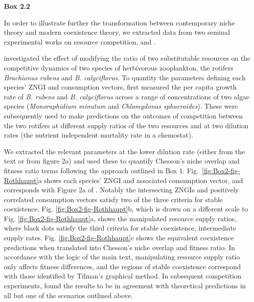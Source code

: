 \clearpage
\begin{flushleft}
	\textbf{Box 2.2}
\end{flushleft}
\begin{infobox}

In order to illustrate further the transformation between contemporary niche theory and modern coexistence theory, we extracted data from two seminal experimental works on resource competition, \citet{Rothhaupt1988} and \citet{Tilman1977}. 
\par


\citet{Rothhaupt1988} investigated the effect of modifying the ratio of two substitutable resources on the competitive dynamics of two species of herbivorous zooplankton, the rotifers \textit{Brachionus rubens} and \textit{B. calyciflorus}. To quantity the parameters defining each species' ZNGI and consumption vectors, \citet{Rothhaupt1988} first measured the per capita growth rate of \textit{B. rubens} and \textit{B. calyciflorus} across a range of concentrations of two algae species (\textit{Monoraphidium minutum} and \textit{Chlamydonas sphaeroides}). These were subsequently used to make predictions on the outcomes of competition between the two rotifers at different supply ratios of the two resources and at two dilution rates (the nutrient independent mortality rate in a chemostat).
\par


We extracted the relevant parameters at the lower dilution rate (either from the text or from figure 2a) and used these to quantify Chesson's niche overlap and fitness ratio terms following the approach outlined in Box 1. Fig.~\ref{fig:Box2-fig-Rothhaupt}a shows each species' ZNGI and associated consumption vector, and corresponds with Figure 2a of \citet{Rothhaupt1988}. Notably the intersecting ZNGIs and positively correlated consumption vectors satisfy two of the three criteria for stable coexistence. Fig. \ref{fig:Box2-fig-Rothhaupt}b, which is drawn on a different scale to Fig. \ref{fig:Box2-fig-Rothhaupt}a, shows the manipulated resource supply ratios, where black dots satisfy the third criteria for stable coexistence, intermediate supply rates. Fig. \ref{fig:Box2-fig-Rothhaupt}c shows the equivalent coexistence predictions when translated into Chesson's niche overlap and fitness ratio. In accordance with the logic of the main text, manipulating resource supply ratio only affects fitness differences, and the regions of stable coexistence correspond with those identified by Tilman's graphical method. In subsequent competition experiments, \citet{Rothhaupt1988} found the results to be in agreement with theoretical predictions in all but one of the scenarios outlined above.
\par



\end{infobox}
